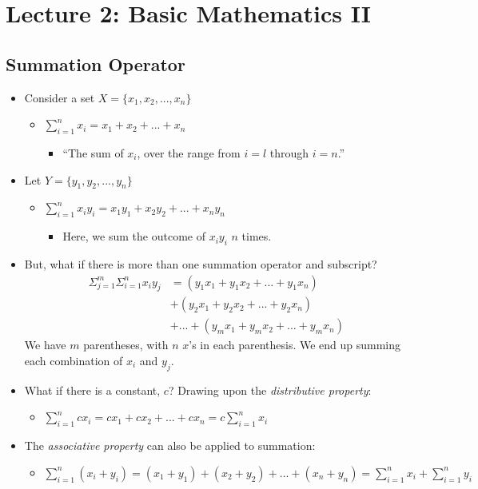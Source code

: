 \section{Lecture 2: Basic Mathematics II}

\subsection{Summation Operator}

\begin{itemize}
    \item Consider a set $X = \{x_1, x_2, ..., x_n\}$
    \begin{itemize}
        \item $\sum\limits_{i = 1}^{n} x_i = x_1 + x_2 + ... + x_n$
        \begin{itemize}
            \item ``The sum of $x_i$, over the range from $i=l$ through $i = n$.''
        \end{itemize}
    \end{itemize}
    \item Let $Y = \{y_1, y_2, ..., y_n\}$ 
    \begin{itemize}
        \item $\sum\limits_{i=1}^n x_iy_i = x_1y_1 + x_2y_2 + ... + x_ny_n$ 
        \begin{itemize}
            \item Here, we sum the outcome of $x_iy_i$ $n$ times.
        \end{itemize}
    \end{itemize}
    \item But, what if there is more than one summation operator and subscript?
    \vspace{-1em}
    \begin{align*}
        \Sigma_{j=1}^m \Sigma_{i=1}^n x_iy_j 
        & = (y_1x_1 + y_1x_2 + ... + y_1x_n)   \\
        & + (y_2x_1 + y_2x_2 + ... + y_2x_n) \\
        & + ... + (y_mx_1 + y_mx_2 + ... + y_mx_n)
    \end{align*}
    We have $m$ parentheses, with $n$ $x$'s in each parenthesis. We end up summing each combination of $x_i$ and $y_j$.
    \item What if there is a constant, $c$? Drawing upon the \emph{distributive property}:
    \begin{itemize}
        \item $\sum\limits_{i = 1}^{n} cx_i = cx_1 + cx_2 + ... + cx_n = c\sum\limits_{i = 1}^{n} x_i$
    \end{itemize}
    \item The \emph{associative property} can also be applied to summation:
    \begin{itemize}
        \item $\sum\limits_{i=1}^n (x_i + y_i) = (x_1 + y_1) + (x_2 + y_2)
            + ... + (x_n + y_n) = \sum\limits_{i=1}^n x_i + \sum\limits_{i=1}^n y_i$
    \end{itemize}
\end{itemize}

